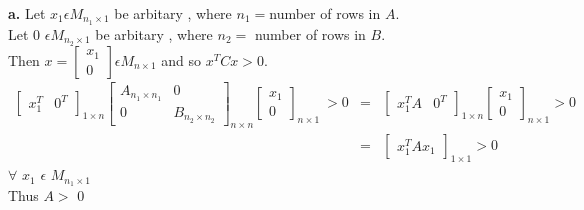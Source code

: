 {\bf a.} Let $x_{1}  \epsilon  M_{n_{1}\times 1}$  be arbitary , where $n_{1} = $number of rows in $A$.
\\Let 0 $\epsilon   M_{n_{2}\times 1}$ be arbitary , where $n_{2}  = $ number of rows in $B$.\\
Then 
$x = \begin{bmatrix} x_{1}\\ 0 \end{bmatrix} \epsilon M_{n\times 1}$ and so $x^{T}Cx > 0.$
\begin{eqnarray*}
\begin{bmatrix}x^{T}_{1} & 0^{T}\end{bmatrix}_{1\times n}
\begin{bmatrix} A_{n_{1}\times n_{1}} & 0 \\ 0 & B_{n_{2}\times n_{2}}\end{bmatrix}_{n\times n}
\begin{bmatrix}x_{1}\\0\end{bmatrix}_{n\times1}  \ >  0
& = & \begin{bmatrix}x^{T}_{1} A & 0^{T}\end{bmatrix}_{1\times n}\begin{bmatrix}x_{1}\\0\end{bmatrix}_{n\times1}  >  0 \\
& = & \begin{bmatrix}x^{T}_{1} A x_{1} \end{bmatrix}_{1\times 1} > 0 
\end{eqnarray*}  $ \forall$  $x_{1}$ $\epsilon$   $M_{n_{1}\times 1}$\\
Thus $  A > $ 0\\

